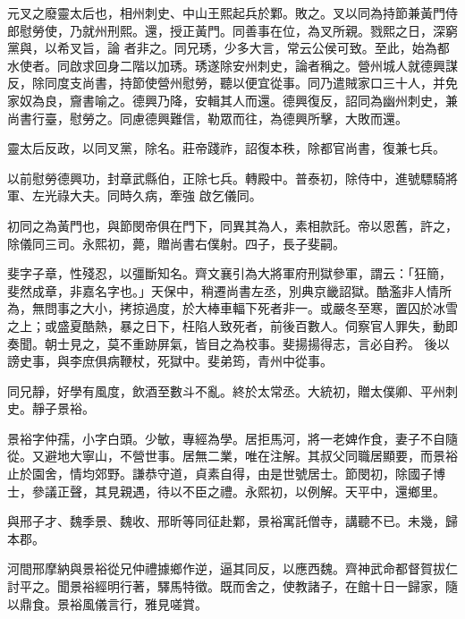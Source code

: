\begin{pinyinscope}
 元叉之廢靈太后也，相州刺史、中山王熙起兵於鄴。敗之。叉以同為持節兼黃門侍郎慰勞使，乃就州刑熙。還，授正黃門。同善事在位，為叉所親。戮熙之日，深窮黨與，以希叉旨，論
 者非之。同兄琇，少多大言，常云公侯可致。至此，始為都水使者。同啟求回身二階以加琇。琇遂除安州刺史，論者稱之。營州城人就德興謀反，除同度支尚書，持節使營州慰勞，聽以便宜從事。同乃遣賊家口三十人，并免家奴為良，齎書喻之。德興乃降，安輯其人而還。德興復反，詔同為幽州刺史，兼尚書行臺，慰勞之。同慮德興難信，勒眾而往，為德興所擊，大敗而還。



 靈太后反政，以同叉黨，除名。莊帝踐祚，詔復本秩，除都官尚書，復兼七兵。



 以前慰勞德興功，封章武縣伯，正除七兵。轉殿中。普泰初，除侍中，進號驃騎將軍、左光祿大夫。同時久病，牽強
 啟乞儀同。



 初同之為黃門也，與節閔帝俱在門下，同異其為人，素相款託。帝以恩舊，許之，除儀同三司。永熙初，薨，贈尚書右僕射。四子，長子斐嗣。



 斐字子章，性殘忍，以彊斷知名。齊文襄引為大將軍府刑獄參軍，謂云：「狂簡，斐然成章，非嘉名字也。」天保中，稍遷尚書左丞，別典京畿詔獄。酷濫非人情所為，無問事之大小，拷掠過度，於大棒車輻下死者非一。或嚴冬至寒，置囚於冰雪之上；或盛夏酷熱，暴之日下，枉陷人致死者，前後百數人。伺察官人罪失，動即奏聞。朝士見之，莫不重跡屏氣，皆目之為校事。斐揚揚得志，言必自矜。
 後以謗史事，與李庶俱病鞭杖，死獄中。斐弟筠，青州中從事。



 同兄靜，好學有風度，飲酒至數斗不亂。終於太常丞。大統初，贈太僕卿、平州刺史。靜子景裕。



 景裕字仲孺，小字白頭。少敏，專經為學。居拒馬河，將一老婢作食，妻子不自隨從。又避地大寧山，不營世事。居無二業，唯在注解。其叔父同職居顯要，而景裕止於園舍，情均郊野。謙恭守道，貞素自得，由是世號居士。節閔初，除國子博士，參議正聲，其見親遇，待以不臣之禮。永熙初，以例解。天平中，還鄉里。



 與邢子才、魏季景、魏收、邢昕等同征赴鄴，景裕寓託僧寺，講聽不已。未幾，歸本郡。



 河間邢摩納與景裕從兄仲禮據鄉作逆，逼其同反，以應西魏。齊神武命都督賀拔仁討平之。聞景裕經明行著，驛馬特徵。既而舍之，使教諸子，在館十日一歸家，隨以鼎食。景裕風儀言行，雅見嗟賞。




\end{pinyinscope}
